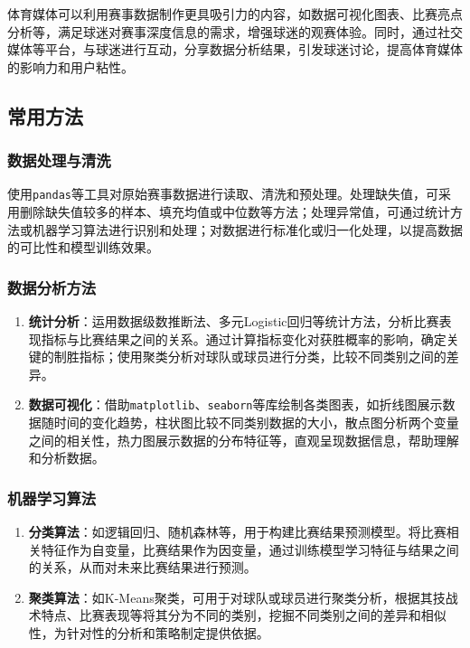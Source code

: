 \documentclass[UTF8]{ctexart}
\begin{document}
体育媒体可以利用赛事数据制作更具吸引力的内容，如数据可视化图表、比赛亮点分析等，满足球迷对赛事深度信息的需求，增强球迷的观赛体验。同时，通过社交媒体等平台，与球迷进行互动，分享数据分析结果，引发球迷讨论，提高体育媒体的影响力和用户粘性。

\subsection{常用方法}\label{ux56dbux5e38ux7528ux65b9ux6cd5}

\subsubsection{数据处理与清洗}\label{ux4e00uxff09ux6570ux636eux5904ux7406ux4e0eux6e05ux6d17}

使用\texttt{pandas}等工具对原始赛事数据进行读取、清洗和预处理。处理缺失值，可采用删除缺失值较多的样本、填充均值或中位数等方法；处理异常值，可通过统计方法或机器学习算法进行识别和处理；对数据进行标准化或归一化处理，以提高数据的可比性和模型训练效果。

\subsubsection{数据分析方法}\label{ux4e8cuxff09ux6570ux636eux5206ux6790ux65b9ux6cd5}

\begin{enumerate}
\def\labelenumi{\arabic{enumi}.}
\item
  \textbf{统计分析}：运用数据级数推断法、多元Logistic回归等统计方法，分析比赛表现指标与比赛结果之间的关系。通过计算指标变化对获胜概率的影响，确定关键的制胜指标；使用聚类分析对球队或球员进行分类，比较不同类别之间的差异。
\item
  \textbf{数据可视化}：借助\texttt{matplotlib}、\texttt{seaborn}等库绘制各类图表，如折线图展示数据随时间的变化趋势，柱状图比较不同类别数据的大小，散点图分析两个变量之间的相关性，热力图展示数据的分布特征等，直观呈现数据信息，帮助理解和分析数据。
\end{enumerate}

\subsubsection{机器学习算法}\label{ux4e09uxff09ux673aux5668ux5b66ux4e60ux7b97ux6cd5}

\begin{enumerate}
\def\labelenumi{\arabic{enumi}.}
\item
  \textbf{分类算法}：如逻辑回归、随机森林等，用于构建比赛结果预测模型。将比赛相关特征作为自变量，比赛结果作为因变量，通过训练模型学习特征与结果之间的关系，从而对未来比赛结果进行预测。
\item
  \textbf{聚类算法}：如K-Means聚类，可用于对球队或球员进行聚类分析，根据其技战术特点、比赛表现等将其分为不同的类别，挖掘不同类别之间的差异和相似性，为针对性的分析和策略制定提供依据。
\end{enumerate}
\end{document}

